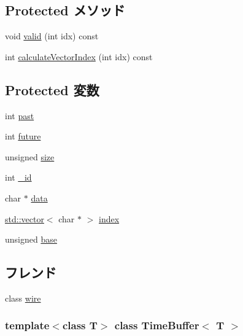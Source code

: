 \subsection*{Protected メソッド}
\begin{DoxyCompactItemize}
\item 
void \hyperlink{classTimeBuffer_ab099fd18174f884c6ac2f044b15a339b}{valid} (int idx) const 
\item 
int \hyperlink{classTimeBuffer_aed7b39afc8e836689841052a53d78662}{calculateVectorIndex} (int idx) const 
\end{DoxyCompactItemize}
\subsection*{Protected 変数}
\begin{DoxyCompactItemize}
\item 
int \hyperlink{classTimeBuffer_acc958e04c64d7f8589872c70820fef8d}{past}
\item 
int \hyperlink{classTimeBuffer_aa241470e0d60c525670c532ac936a87b}{future}
\item 
unsigned \hyperlink{classTimeBuffer_a245260f6f74972558f61b85227df5aae}{size}
\item 
int \hyperlink{classTimeBuffer_a16857ed9e195eac0e20e389fd4a68da2}{\_\-id}
\item 
char $\ast$ \hyperlink{classTimeBuffer_a91a70b77df95bd8b0830b49a094c2acb}{data}
\item 
\hyperlink{classstd_1_1vector}{std::vector}$<$ char $\ast$ $>$ \hyperlink{classTimeBuffer_ac3457cf300977865df9ce15f184df586}{index}
\item 
unsigned \hyperlink{classTimeBuffer_a4f854c367e232881b46a19b16f2518dc}{base}
\end{DoxyCompactItemize}
\subsection*{フレンド}
\begin{DoxyCompactItemize}
\item 
class \hyperlink{classTimeBuffer_a064260780ae3c86e44412c39e51c804b}{wire}
\end{DoxyCompactItemize}
\subsubsection*{template$<$class T$>$ class TimeBuffer$<$ T $>$}



